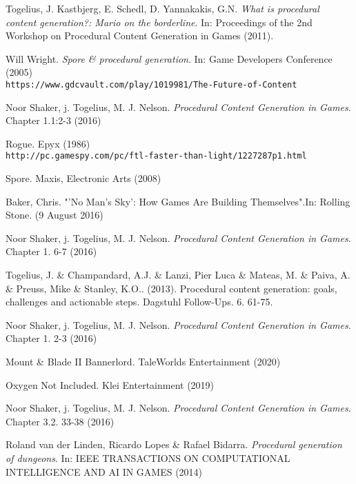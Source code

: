 

\begin{thebibliography}{9}

 Togelius, J. Kastbjerg, E. Schedl, D. Yannakakis, G.N. \textit{What is procedural content generation?: Mario on the borderline}.  In: Proceedings of the 2nd Workshop on Procedural Content Generation in Games (2011).

 Will Wright. \textit{Spore \& procedural generation}. In: Game Developers Conference (2005) \\\texttt{https://www.gdcvault.com/play/1019981/The-Future-of-Content}
 
 Noor Shaker, j. Togelius, M. J. Nelson. \textit{Procedural Content Generation in Games}. Chapter 1.1:2-3 (2016)

 Rogue. Epyx (1986) \\
\texttt{http://pc.gamespy.com/pc/ftl-faster-than-light/1227287p1.html}

Spore. Maxis, Electronic Arts (2008)

Baker, Chris. "'No Man's Sky': How Games Are Building Themselves".In: Rolling Stone. (9 August 2016)

 Noor Shaker, j. Togelius, M. J. Nelson. \textit{Procedural Content Generation in Games}. Chapter 1. 6-7 (2016)

Togelius, J. \& Champandard, A.J. \& Lanzi, Pier Luca \& Mateas, M. \& Paiva, A. \& Preuss, Mike \& Stanley, K.O.. (2013). Procedural content generation: goals, challenges and actionable steps. Dagstuhl Follow-Ups. 6. 61-75. 

 Noor Shaker, j. Togelius, M. J. Nelson. \textit{Procedural Content Generation in Games}. Chapter 1. 2-3 (2016)

Mount \& Blade II Bannerlord. TaleWorlds Entertainment (2020)

Oxygen Not Included.  Klei Entertainment (2019)

 Noor Shaker, j. Togelius, M. J. Nelson. \textit{Procedural Content Generation in Games}. Chapter 3.2. 33-38 (2016)

Roland van der Linden, Ricardo Lopes \& Rafael Bidarra. \textit{Procedural generation of dungeons}. In: IEEE TRANSACTIONS ON COMPUTATIONAL INTELLIGENCE AND AI IN GAMES (2014)


\end{thebibliography}
